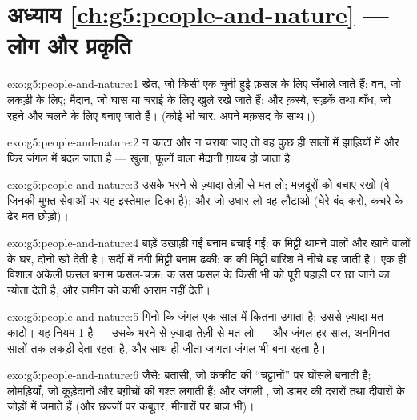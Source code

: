 \section*{अध्याय \ref{ch:g5:people-and-nature} --- लोग और प्रकृति}

\begin{solution}{exo:g5:people-and-nature:1}
खेत, जो किसी एक चुनी हुई फ़सल के लिए सँभाले जाते हैं; वन, जो लकड़ी के
लिए; मैदान, जो घास या चराई के लिए खुले रखे जाते हैं; और क़स्बे, सड़कें
तथा बाँध, जो रहने और चलने के लिए बनाए जाते हैं। (कोई भी चार, अपने
मक़सद के साथ।)
\end{solution}

\begin{solution}{exo:g5:people-and-nature:2}
न काटा और न चराया जाए तो वह कुछ ही सालों में झाड़ियों में और फिर जंगल
में बदल जाता है --- खुला, फूलों वाला मैदानी  ग़ायब हो जाता है।
\end{solution}

\begin{solution}{exo:g5:people-and-nature:3}
उसके भरने से ज़्यादा तेज़ी से मत लो; मज़दूरों को बचाए रखो (वे 
जिनकी मुफ़्त सेवाओं पर यह इस्तेमाल टिका है); और जो उधार लो वह लौटाओ
(घेरे बंद करो, कचरे के ढेर मत छोड़ो)।
\end{solution}

\begin{solution}{exo:g5:people-and-nature:4}
बाड़ें उखाड़ी गईं बनाम बचाई गईं: क मिट्टी थामने वालों और  खाने वालों
के घर, दोनों खो देती है। सर्दी में नंगी मिट्टी बनाम ढकी: क की मिट्टी
बारिश में नीचे बह जाती है। एक ही विशाल अकेली फ़सल बनाम फ़सल-चक्र: क उस
फ़सल के किसी भी  को पूरी पहाड़ी पर छा जाने का न्योता देती है, और
ज़मीन को कभी आराम नहीं देती।
\end{solution}

\begin{solution}{exo:g5:people-and-nature:5}
गिनो कि जंगल एक साल में कितना उगाता है; उससे ज़्यादा मत काटो। यह नियम 1
है --- उसके भरने से ज़्यादा तेज़ी से मत लो --- और जंगल हर साल, अनगिनत
सालों तक लकड़ी देता रहता है, और साथ ही जीता-जागता जंगल भी बना रहता है।
\end{solution}

\begin{solution}{exo:g5:people-and-nature:6}
जैसे: बतासी, जो कंक्रीट की ``चट्टानों'' पर घोंसले बनाती है; लोमड़ियाँ,
जो कूड़ेदानों और बग़ीचों की गश्त लगाती हैं; और जंगली , जो डामर की
दरारों तथा दीवारों के जोड़ों में  जमाते हैं (और छज्जों पर कबूतर,
मीनारों पर बाज़ भी)।
\end{solution}

